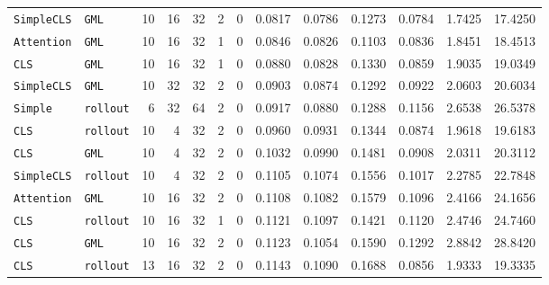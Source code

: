 \begin{table}[H]
\begin{tabular}{
l
l
r
r
r
r
r
S[table-format=1.4]
S[table-format=1.4]
S[table-format=2.4]
S[table-format=2.4]
S[table-format=3.4]
S[table-format=4.4]
}
\texttt{SimpleCLS} & \texttt{GML} & 10 & \textcolor{gray!55}{16} & \textcolor{gray!55}{32} & \textcolor{gray!55}{2} & \textcolor{gray!55}{0} & 0.0817 & 0.0786 & 0.1273 & 0.0784 & 1.7425 & 17.4250 \\
\texttt{Attention} & \texttt{GML} & 10 & \textcolor{gray!55}{16} & \textcolor{gray!55}{32} & 1 & 0 & 0.0846 & 0.0826 & 0.1103 & 0.0836 & 1.8451 & 18.4513 \\
\texttt{CLS} & \texttt{GML} & 10 & \textcolor{gray!55}{16} & \textcolor{gray!55}{32} & 1 & 0 & 0.0880 & 0.0828 & 0.1330 & 0.0859 & 1.9035 & 19.0349 \\
\texttt{SimpleCLS} & \texttt{GML} & \textcolor{gray!55}{10} & 32 & \textcolor{gray!55}{32} & \textcolor{gray!55}{2} & \textcolor{gray!55}{0} & 0.0903 & 0.0874 & 0.1292 & 0.0922 & 2.0603 & 20.6034 \\
\texttt{Simple} & \texttt{rollout} & 6 & 32 & 64 & \textcolor{gray!55}{2} & \textcolor{gray!55}{0} & 0.0917 & 0.0880 & 0.1288 & 0.1156 & 2.6538 & 26.5378 \\
\texttt{CLS} & \texttt{rollout} & \textcolor{gray!55}{10} & 4 & \textcolor{gray!55}{32} & \textcolor{gray!55}{2} & \textcolor{gray!55}{0} & 0.0960 & 0.0931 & 0.1344 & 0.0874 & 1.9618 & 19.6183 \\
\texttt{CLS} & \texttt{GML} & \textcolor{gray!55}{10} & 4 & \textcolor{gray!55}{32} & \textcolor{gray!55}{2} & \textcolor{gray!55}{0} & 0.1032 & 0.0990 & 0.1481 & 0.0908 & 2.0311 & 20.3112 \\
\texttt{SimpleCLS} & \texttt{rollout} & \textcolor{gray!55}{10} & 4 & \textcolor{gray!55}{32} & \textcolor{gray!55}{2} & \textcolor{gray!55}{0} & 0.1105 & 0.1074 & 0.1556 & 0.1017 & 2.2785 & 22.7848 \\
\texttt{Attention} & \texttt{GML} & 10 & \textcolor{gray!55}{16} & \textcolor{gray!55}{32} & 2 & 0 & 0.1108 & 0.1082 & 0.1579 & 0.1096 & 2.4166 & 24.1656 \\
\texttt{CLS} & \texttt{rollout} & 10 & \textcolor{gray!55}{16} & \textcolor{gray!55}{32} & 1 & 0 & 0.1121 & 0.1097 & 0.1421 & 0.1120 & 2.4746 & 24.7460 \\
\texttt{CLS} & \texttt{GML} & \textcolor{gray!55}{10} & \textcolor{gray!55}{16} & \textcolor{gray!55}{32} & \textcolor{gray!55}{2} & \textcolor{gray!55}{0} & 0.1123 & 0.1054 & 0.1590 & 0.1292 & 2.8842 & 28.8420 \\
\texttt{CLS} & \texttt{rollout} & 13 & \textcolor{gray!55}{16} & \textcolor{gray!55}{32} & \textcolor{gray!55}{2} & \textcolor{gray!55}{0} & 0.1143 & 0.1090 & 0.1688 & 0.0856 & 1.9333 & 19.3335 \\

\end{tabular}
\end{table}
